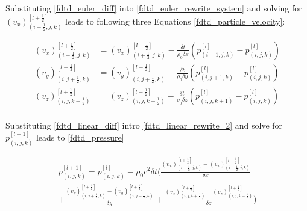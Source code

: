 Substituting \autoref{fdtd_euler_diff} into \autoref{fdtd_euler_rewrite_system} and solving for $(v_x)_{(i+\frac{1}{2},j,k)}^{[l+\frac{1}{2}]}$ leads to following three Equations \ref{fdtd_particle_velocity}:


\begin{subequations}\label{fdtd_particle_velocity}
\begin{alignat}{2}
(v_x)_{(i+\frac{1}{2},j,k)}^{[l+\frac{1}{2}]}&= (v_x)_{(i+\frac{1}{2},j,k)}^{[l-\frac{1}{2}]}-\frac{\delta t}{\rho_0 \delta x} \left( p_{(i+1,j,k)}^{[l]} -p_{(i,j,k)}^{[l]}  \right)\\
(v_y)_{(i,j+\frac{1}{2},k)}^{[l+\frac{1}{2}]}&= (v_y)_{(i,j+\frac{1}{2},k)}^{[l-\frac{1}{2}]}-\frac{\delta t}{\rho_0 \delta y} \left( p_{(i,j+1,k)}^{[l]} -p_{(i,j,k)}^{[l]}  \right)\\
(v_z)_{(i,j,k+\frac{1}{2})}^{[l+\frac{1}{2}]}&= (v_z)_{(i,j,k+\frac{1}{2})}^{[l-\frac{1}{2}]}-\frac{\delta t}{\rho_0 \delta z} \left( p_{(i,j,k+1)}^{[l]} -p_{(i,j,k)}^{[l]}  \right)
\end{alignat}
\end{subequations}
\\



Substituting \autoref{fdtd_linear_diff} intro \autoref{fdtd_linear_rewrite_2} and solve for $p_{(i,j,k)}^{[l+1]}$ leads to  \autoref{fdtd_pressure}




\begin{multline}\label{fdtd_pressure}
p_{(i,j,k)}^{[l+1]} = p_{(i,j,k)}^{[l]} - \rho_0 c^2 \delta t \Biggl( \frac{(v_x)_{(i+\frac{1}{2},j,k)}^{[l+\frac{1}{2}]} - (v_x)_{(i-\frac{1}{2},j,k)}^{[l+\frac{1}{2}]}}{\delta x} \\ 
+ \frac{(v_y)_{(i,j+\frac{1}{2},k)}^{[l+\frac{1}{2}]}-(v_y)_{(i,j-\frac{1}{2},k)}^{[l+\frac{1}{2}]}}{\delta y} +  \frac{(v_z)_{(i,j,k+\frac{1}{2})}^{[l+\frac{1}{2}]}-(v_z)_{(i,j,k-\frac{1}{2})}^{[l+\frac{1}{2}]}}{\delta z} \Biggr)
\end{multline}

